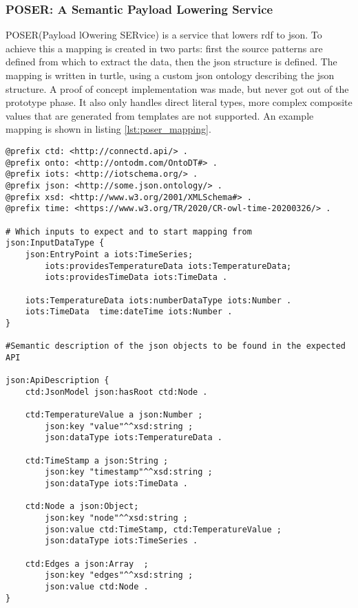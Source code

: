 \subsubsection{POSER: A Semantic Payload Lowering Service \citep{poser}}
POSER(Payload lOwering SERvice) is a service that lowers \acrshort{rdf} to \acrshort{json}. To achieve this a mapping is created in two parts: first the source patterns are defined from which to extract the data, then the json structure is defined. The mapping is written in turtle, using a custom json ontology describing the json structure. A proof of concept implementation was made, but never got out of the prototype phase. It also only handles direct literal types, more complex composite values that are generated from templates are not supported. An example mapping is shown in listing \ref{lst:poser_mapping}.

\begin{lstlisting}[caption={Example of a POSER mapping}, label={lst:poser_mapping}, captionpos=b, basicstyle=\small, frame=single]
@prefix ctd: <http://connectd.api/> .
@prefix onto: <http://ontodm.com/OntoDT#> .
@prefix iots: <http://iotschema.org/> .
@prefix json: <http://some.json.ontology/> .
@prefix xsd: <http://www.w3.org/2001/XMLSchema#> .
@prefix time: <https://www.w3.org/TR/2020/CR-owl-time-20200326/> .

# Which inputs to expect and to start mapping from
json:InputDataType {
    json:EntryPoint a iots:TimeSeries;
        iots:providesTemperatureData iots:TemperatureData;
        iots:providesTimeData iots:TimeData .

    iots:TemperatureData iots:numberDataType iots:Number .
    iots:TimeData  time:dateTime iots:Number .
}

#Semantic description of the json objects to be found in the expected API

json:ApiDescription {
    ctd:JsonModel json:hasRoot ctd:Node .

    ctd:TemperatureValue a json:Number ;
        json:key "value"^^xsd:string ;
        json:dataType iots:TemperatureData .

    ctd:TimeStamp a json:String ;
        json:key "timestamp"^^xsd:string ;
        json:dataType iots:TimeData .

    ctd:Node a json:Object;
        json:key "node"^^xsd:string ;
        json:value ctd:TimeStamp, ctd:TemperatureValue ;
        json:dataType iots:TimeSeries .

    ctd:Edges a json:Array	;
        json:key "edges"^^xsd:string ;
        json:value ctd:Node .
}
\end{lstlisting}

